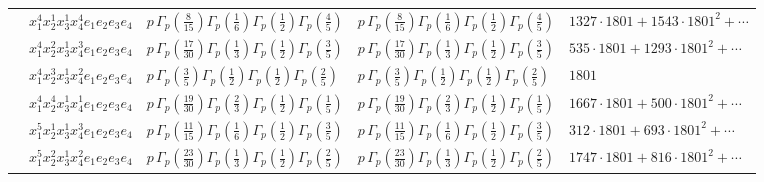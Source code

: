 \documentclass[11pt]{article}
\begin{document}
\begin{table}[ht]
{\begin{tabular}{@{}lllll@{}}
 & $x_{1}^{4} x_{2}^{1} x_{3}^{1} x_{4}^{4}  e_{1} e_{2} e_{3} e_{4}$ & $p \, \Gamma_p \left( \frac{8}{15} \right) \Gamma_p \left( \frac{1}{6} \right) \Gamma_p \left( \frac{1}{2} \right) \Gamma_p \left( \frac{4}{5} \right)$ & $p \, \Gamma_p \left( \frac{8}{15} \right) \Gamma_p \left( \frac{1}{6} \right) \Gamma_p \left( \frac{1}{2} \right) \Gamma_p \left( \frac{4}{5} \right)$ & $1327{\cdot}1801{+}1543{\cdot}1801^{2}{+}\cdots$ \\
 & $x_{1}^{4} x_{2}^{2} x_{3}^{1} x_{4}^{3}  e_{1} e_{2} e_{3} e_{4}$ & $p \, \Gamma_p \left( \frac{17}{30} \right) \Gamma_p \left( \frac{1}{3} \right) \Gamma_p \left( \frac{1}{2} \right) \Gamma_p \left( \frac{3}{5} \right)$ & $p \, \Gamma_p \left( \frac{17}{30} \right) \Gamma_p \left( \frac{1}{3} \right) \Gamma_p \left( \frac{1}{2} \right) \Gamma_p \left( \frac{3}{5} \right)$ & $535{\cdot}1801{+}1293{\cdot}1801^{2}{+}\cdots$ \\
 & $x_{1}^{4} x_{2}^{3} x_{3}^{1} x_{4}^{2}  e_{1} e_{2} e_{3} e_{4}$ & $p \, \Gamma_p \left( \frac{3}{5} \right) \Gamma_p \left( \frac{1}{2} \right) \Gamma_p \left( \frac{1}{2} \right) \Gamma_p \left( \frac{2}{5} \right)$ & $p \, \Gamma_p \left( \frac{3}{5} \right) \Gamma_p \left( \frac{1}{2} \right) \Gamma_p \left( \frac{1}{2} \right) \Gamma_p \left( \frac{2}{5} \right)$ & $1801$ \\
 & $x_{1}^{4} x_{2}^{4} x_{3}^{1} x_{4}^{1}  e_{1} e_{2} e_{3} e_{4}$ & $p \, \Gamma_p \left( \frac{19}{30} \right) \Gamma_p \left( \frac{2}{3} \right) \Gamma_p \left( \frac{1}{2} \right) \Gamma_p \left( \frac{1}{5} \right)$ & $p \, \Gamma_p \left( \frac{19}{30} \right) \Gamma_p \left( \frac{2}{3} \right) \Gamma_p \left( \frac{1}{2} \right) \Gamma_p \left( \frac{1}{5} \right)$ & $1667{\cdot}1801{+}500{\cdot}1801^{2}{+}\cdots$ \\
 & $x_{1}^{5} x_{2}^{1} x_{3}^{1} x_{4}^{3}  e_{1} e_{2} e_{3} e_{4}$ & $p \, \Gamma_p \left( \frac{11}{15} \right) \Gamma_p \left( \frac{1}{6} \right) \Gamma_p \left( \frac{1}{2} \right) \Gamma_p \left( \frac{3}{5} \right)$ & $p \, \Gamma_p \left( \frac{11}{15} \right) \Gamma_p \left( \frac{1}{6} \right) \Gamma_p \left( \frac{1}{2} \right) \Gamma_p \left( \frac{3}{5} \right)$ & $312{\cdot}1801{+}693{\cdot}1801^{2}{+}\cdots$ \\
 & $x_{1}^{5} x_{2}^{2} x_{3}^{1} x_{4}^{2}  e_{1} e_{2} e_{3} e_{4}$ & $p \, \Gamma_p \left( \frac{23}{30} \right) \Gamma_p \left( \frac{1}{3} \right) \Gamma_p \left( \frac{1}{2} \right) \Gamma_p \left( \frac{2}{5} \right)$ & $p \, \Gamma_p \left( \frac{23}{30} \right) \Gamma_p \left( \frac{1}{3} \right) \Gamma_p \left( \frac{1}{2} \right) \Gamma_p \left( \frac{2}{5} \right)$ & $1747{\cdot}1801{+}816{\cdot}1801^{2}{+}\cdots$ \\

\end{tabular}}
\end{table}
\end{document}
